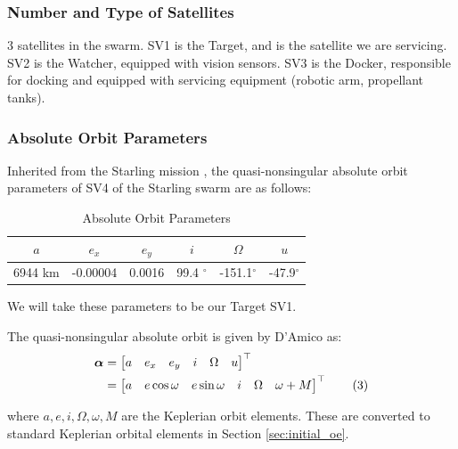\subsubsection{Number and Type of Satellites}
3 satellites in the swarm. SV1 is the Target, and is the satellite we are servicing. SV2 is the Watcher, equipped with vision sensors. SV3 is the Docker, responsible for docking and equipped with servicing equipment (robotic arm, propellant tanks).

\subsubsection{Absolute Orbit Parameters}
Inherited from the Starling mission \cite{krugerorbit}, the quasi-nonsingular absolute orbit parameters of SV4 of the Starling swarm are as follows:
\begin{table}[h]
\centering
\begin{tabular}{cccccc} \hline
    $a$ & $e_x$ & $e_y$ & $i$ & $\Omega$ & $u$ \\ \hline 
     6944 km & -0.00004 & 0.0016 & 99.4 $^\circ$ & -151.1$^\circ$ & -47.9$^\circ$ \\ \hline
\end{tabular}
\caption{Absolute Orbit Parameters}
\label{tab:abs_oe}
\end{table}

We will take these parameters to be our Target SV1. 

The quasi-nonsingular absolute orbit is given by D'Amico \cite{damicothesis} as:
\begin{align}
\boldsymbol{\alpha} &= 
\begin{bmatrix}
a & e_x & e_y & i & \Omega & u
\end{bmatrix}^\top \notag \\
&= 
\begin{bmatrix}
a & e \cos \omega & e \sin \omega & i & \Omega & \omega + M
\end{bmatrix}^\top \tag{3}
\end{align}

where $a, e, i, \Omega, \omega, M$ are the Keplerian orbit elements. These are converted to standard Keplerian orbital elements in Section \ref{sec:initial_oe}.

